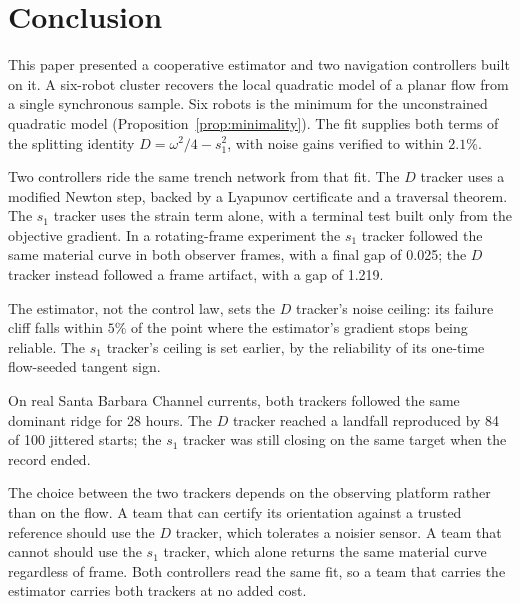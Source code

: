 \documentclass[lettersize,journal]{IEEEtran}
\begin{document}
\section{Conclusion}
\label{sec:conclusion}


This paper presented a cooperative estimator and two navigation
controllers built on it. A six-robot cluster recovers the local
quadratic model of a planar flow from a single synchronous sample.
Six robots is the minimum for the unconstrained quadratic model
(Proposition~\ref{prop:minimality}). The fit supplies both terms of the
splitting identity $D = \omega^2/4 - s_1^2$, with noise gains verified
to within $2.1\%$.

Two controllers ride the same trench network from that fit. The $D$
tracker uses a modified Newton step, backed by a Lyapunov certificate
and a traversal theorem. The $s_1$ tracker uses the strain term alone,
with a terminal test built only from the objective gradient. In a
rotating-frame experiment the $s_1$ tracker followed the same material
curve in both observer frames, with a final gap of 0.025; the $D$
tracker instead followed a frame artifact, with a gap of 1.219.

The estimator, not the control law, sets the $D$ tracker's noise
ceiling: its failure cliff falls within $5\%$ of the point where the
estimator's gradient stops being reliable. The $s_1$ tracker's ceiling
is set earlier, by the reliability of its one-time flow-seeded tangent
sign.

On real Santa Barbara Channel currents, both trackers followed the same
dominant ridge for 28 hours. The $D$ tracker reached a landfall
reproduced by 84 of 100 jittered starts; the $s_1$ tracker was still
closing on the same target when the record ended.

The choice between the two trackers depends on the observing platform
rather than on the flow. A team that can certify its orientation
against a trusted reference should use the $D$ tracker, which tolerates
a noisier sensor. A team that cannot should use the $s_1$ tracker,
which alone returns the same material curve regardless of frame. Both
controllers read the same fit, so a team that carries the estimator
carries both trackers at no added cost.
\end{document}
